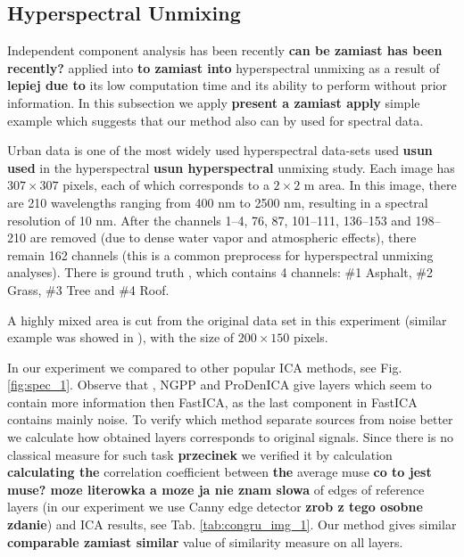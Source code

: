 \subsection{Hyperspectral Unmixing}

Independent component analysis has been recently \textbf{can be zamiast has been recently?}
applied into \textbf{to zamiast into} hyperspectral unmixing 
\cite{wang2015abundance}
as a result of \textbf{lepiej due to} its low
computation time and its ability to perform without prior information.
In this subsection we apply \textbf{present a zamiast apply} simple example which suggests that our method also can by used for spectral data.

Urban data  \cite{fyzhu2014IJPRSSSNMF,fyzhu2014TIPDgSNMF,fyzhu2014JSTSPRRLbSF} is one of the most widely used hyperspectral data-sets used \textbf{usun used} in the hyperspectral \textbf{usun hyperspectral} unmixing study. Each image has $307 \times 307$ pixels, each of which corresponds to a $2 \times 2$ m area. In this image, there are 210 wavelengths ranging from 400 nm  to 2500 nm, resulting in a spectral resolution of 10 nm. After the channels 1--4, 76, 87, 101--111, 136--153 and 198--210 are removed (due to dense water vapor and atmospheric effects), there remain 162  channels (this is a common preprocess for hyperspectral unmixing analyses). There is ground truth \cite{fyzhu2014IJPRSSSNMF,fyzhu2014TIPDgSNMF,fyzhu2014JSTSPRRLbSF}, which contains 4 channels: \#1 Asphalt, \#2 Grass, \#3 Tree and \#4 Roof.

A highly mixed area is cut from the original data set in this experiment (similar example was showed in \cite{wang2015abundance}), with the size of $200 \times 150$ pixels. %

In our experiment we compared \ICA{} to other popular ICA methods, see Fig. \ref{fig:spec_1}. Observe that \ICA{}, NGPP and ProDenICA give layers which seem to contain more information then FastICA, as the last component in FastICA contains mainly noise. To verify which method separate sources from noise better we calculate how obtained layers corresponds to original signals. Since there is no classical measure for such task \textbf{przecinek} we verified it by calculation \textbf{calculating the} correlation coefficient between \textbf{the} average muse \textbf{co to jest muse? moze literowka a moze ja nie znam slowa} of edges of reference layers (in our experiment we use Canny edge detector \textbf{zrob z tego osobne zdanie}) and ICA results, see Tab. \ref{tab:congru_img_1}. Our method gives similar \textbf{comparable zamiast similar} value of similarity measure on all layers. 


